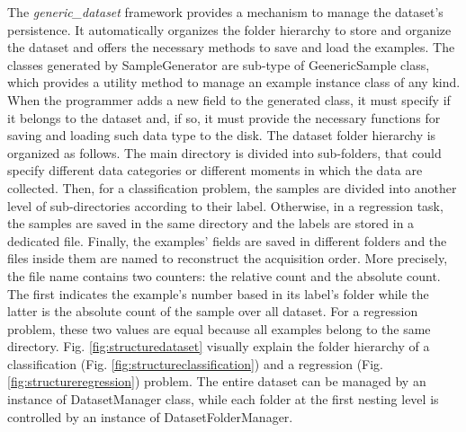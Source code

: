 The \textit{generic\_dataset} framework provides a mechanism to manage the dataset's persistence. It automatically organizes the folder hierarchy to store and organize the dataset and offers the necessary methods to save and load the examples. The classes generated by \textsf{SampleGenerator} are sub-type of \textsf{GeenericSample} class, which provides a utility method to manage an example instance class of any kind. When the programmer adds a new field to the generated class, it must specify if it belongs to the dataset and, if so, it must provide the necessary functions for saving and loading such data type to the disk. The dataset folder hierarchy is organized as follows. The main directory is divided into sub-folders, that could specify different data categories or different moments in which the data are collected. Then, for a classification problem, the samples are divided into another level of sub-directories according to their label. Otherwise, in a regression task, the samples are saved in the same directory and the labels are stored in a dedicated file. Finally, the examples' fields are saved in different folders and the files inside them are named to reconstruct the acquisition order. More precisely, the file name contains two counters: the relative count and the absolute count. The first indicates the example's number based in its label's folder while the latter is the absolute count of the sample over all dataset. For a regression problem, these two values are equal because all examples belong to the same directory. Fig. \ref{fig:structuredataset} visually explain the folder hierarchy of a classification (Fig. \ref{fig:structureclassification}) and a regression (Fig. \ref{fig:structureregression}) problem. The entire dataset can be managed by an instance of \textsf{DatasetManager} class, while each folder at the first nesting level is controlled by an instance of \textsf{DatasetFolderManager}.

